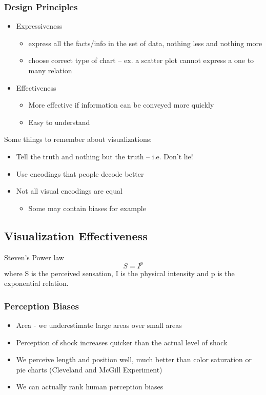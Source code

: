 \subsubsection{Design Principles}
\begin{itemize}
    \item Expressiveness
        \begin{itemize}
            \item express all the facts/info in the set of data, nothing less and nothing more
            \item choose correct type of chart -- ex. a scatter plot cannot express a one to many relation
        \end{itemize} 
    \item Effectiveness
    \begin{itemize}
        \item More effective if information can be conveyed more quickly
        \item Easy to understand
    \end{itemize} 
\end{itemize}
Some things to remember about visualizations:
\begin{itemize}
    \item Tell the truth and nothing but the truth -- i.e. Don't lie!
    \item Use encodings that people decode better
    \item Not all visual encodings are equal
    \begin{itemize}
        \item Some may contain biases for example
    \end{itemize}
\end{itemize}

\subsection{Visualization Effectiveness}
Steven's Power law \[S = I^p\]
where S is the perceived sensation, I is the physical intensity and p is the exponential relation. 
\subsubsection{Perception Biases}
\begin{itemize}
    \item Area - we underestimate large areas over small areas 
    \item Perception of shock increases quicker than the actual level of shock
    \item We perceive length and position well, much better than color saturation or pie charts (Cleveland and McGill Experiment)
    \item We can actually rank human perception biases
\end{itemize}

